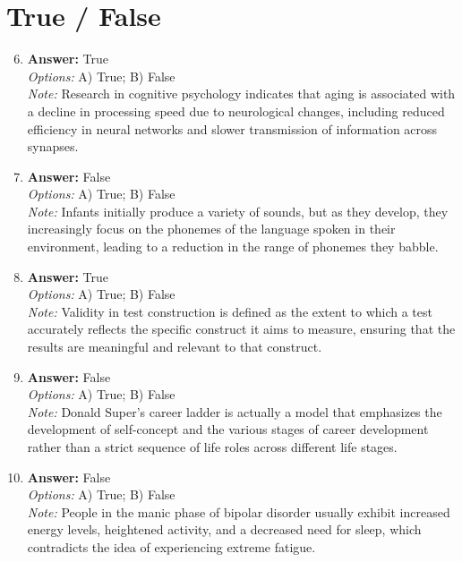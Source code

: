 \documentclass[12pt]{article}
\begin{document}
\section*{True / False}
\begin{enumerate}[label=\arabic*.]
\setcounter{enumi}{5}
\item \textbf{Answer:} True
\\ \textit{Options:} A) True; B) False
\\ \textit{Note:} Research in cognitive psychology indicates that aging is associated with a decline in processing speed due to neurological changes, including reduced efficiency in neural networks and slower transmission of information across synapses.
\item \textbf{Answer:} False
\\ \textit{Options:} A) True; B) False
\\ \textit{Note:} Infants initially produce a variety of sounds, but as they develop, they increasingly focus on the phonemes of the language spoken in their environment, leading to a reduction in the range of phonemes they babble.
\item \textbf{Answer:} True
\\ \textit{Options:} A) True; B) False
\\ \textit{Note:} Validity in test construction is defined as the extent to which a test accurately reflects the specific construct it aims to measure, ensuring that the results are meaningful and relevant to that construct.
\item \textbf{Answer:} False
\\ \textit{Options:} A) True; B) False
\\ \textit{Note:} Donald Super's career ladder is actually a model that emphasizes the development of self-concept and the various stages of career development rather than a strict sequence of life roles across different life stages.
\item \textbf{Answer:} False
\\ \textit{Options:} A) True; B) False
\\ \textit{Note:} People in the manic phase of bipolar disorder usually exhibit increased energy levels, heightened activity, and a decreased need for sleep, which contradicts the idea of experiencing extreme fatigue.
\end{enumerate}
\end{document}
